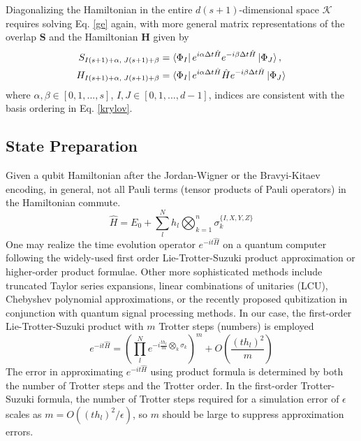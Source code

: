 \documentclass[journal=jctcce,manuscript=article]{achemso}
\begin{document}
Diagonalizing the Hamiltonian in the entire $d(s+1)$-dimensional space $\mathcal{K}$ requires solving Eq. \ref{ge} again, with more general matrix representations of the overlap $\mathbf{S}$ and the Hamiltonian $\mathbf{H}$ given by
\begin{align}
\label{overlap_eq}
S_{I(s+1)+\alpha,\; J(s+1)+\beta} &= \left\langle{\Phi_I}\right\vert e^{i \alpha \Delta t \hat{H}} e^{-i \beta \Delta t \hat{H}} \left\vert{\Phi_J}\right\rangle, \\
\label{hamiltonian_eq}
H_{I(s+1)+\alpha,\; J(s+1)+\beta} &= \left\langle{\Phi_I}\right\vert e^{i \alpha \Delta t \hat{H}} \hat{H} e^{-i \beta \Delta t \hat{H}} \left\vert{\Phi_J}\right\rangle
\end{align}
where $\alpha, \beta \in [0,1,...,s]$, $I, J \in [0,1,...,d-1]$, indices are consistent with the basis ordering in Eq. \ref{krylov}. 

\subsection{State Preparation} 

Given a qubit Hamiltonian after the Jordan-Wigner\cite{jordan1993paulische} or the Bravyi-Kitaev encoding,\cite{Bravyi2002, Seeley:2012em} in general, not all Pauli terms (tensor products of Pauli operators) in the Hamiltonian commute.
\begin{equation}
\hat{H}=E_{0}+\sum_{l}^{N} h_{l} \bigotimes_{k=1}^{n} \sigma_{k}^{\{I, X, Y, Z\}}
\end{equation}
One may realize the time evolution operator $e^{-i t \hat{H}}$ on a quantum computer following the widely-used first order Lie-Trotter-Suzuki product approximation\cite{Trotter:1959wh, Suzuki:1991fz, hatano2005finding} or higher-order product formulae\cite{Suzuki:1976cf, Berry:2007iw}. 
Other more sophisticated methods include truncated Taylor series expansions,\cite{Berry:2015ir, Babbush:2016bx}
linear combinations of unitaries (LCU),\cite{Childs:2012cg}
Chebyshev polynomial approximations,\cite{Subramanian:2019ex} 
or the recently proposed qubitization\cite{Low:2019kr, Berry:2019bb} in conjunction with quantum signal processing\cite{Low:2017kn} methods.
In our case, the first-order Lie-Trotter-Suzuki product with $m$ Trotter steps (numbers) is employed
\begin{equation}
e^{-i t \hat{H}}=\left(\prod_{l}^N e^{-i \frac{t h_{l}}{m} \bigotimes_{k} \sigma_{k}}\right)^{m} 
+ O\left(\frac{(t h_{l})^{2}} {m}\right)
\end{equation}
The error in approximating $e^{-i t \hat{H}}$ using product formula is determined by both the number of Trotter steps and the Trotter order. 
In the first-order Trotter-Suzuki formula, the number of Trotter steps required for a simulation error of $\epsilon$ scales as $m = O((t h_{l})^{2} / \epsilon)$, so $m$ should be large to suppress approximation errors. 
\end{document}
